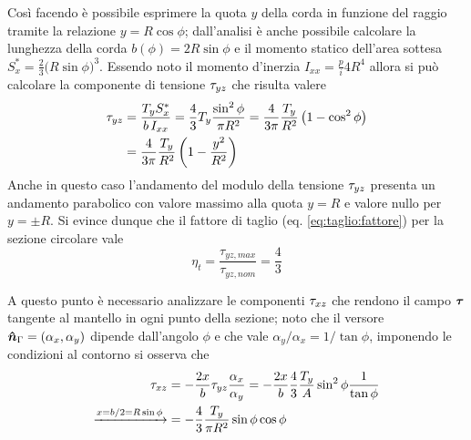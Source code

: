 		Così facendo è possibile esprimere la quota $y$ della corda in funzione del raggio tramite la relazione $y = R\cos\phi$; dall'analisi è anche possibile calcolare la lunghezza della corda $b(\phi) = 2R \sin\phi$ e il momento statico dell'area sottesa $S_x^* = \frac 2 3 \big(R\sin\phi\big)^3$. Essendo noto il momento d'inerzia $I_{xx} = \frac pi 4 R^4$ allora si può calcolare la componente di tensione $\tau_{yz}$ che risulta valere
		\begin{align*}
			\tau_{yz} &  = \frac {T_y S_x^*}{b\,I_{xx}} = \frac 4 3 T_y \frac{\sin^2\phi}{\pi R^2} = \frac 4{3\pi} \frac {T_y} {R^2} \left(1-\cos^2\phi\right) \\
			&  = \frac 4{3\pi} \frac {T_y} {R^2} \left(1-\frac{y^2}{R^2}\right)
		\end{align*}
		Anche in questo caso l'andamento del modulo della tensione $\tau_{yz}$ presenta un andamento parabolico con valore massimo alla quota $y = R$ e valore nullo per $y = \pm R$. Si evince dunque che il fattore di taglio (eq. \ref{eq:taglio:fattore}) per la sezione circolare vale
		\[ \eta_t = \frac{\tau_{yz,max}}{\tau_{yz,nom}} = \frac 4 3  \]
		
		\vspace{3mm}
		A questo punto è necessario analizzare le componenti $\tau_{xz}$ che rendono il campo $\boldsymbol{\tau}$ tangente al mantello in ogni punto della sezione; noto che il versore $\boldsymbol{\hat{n}}_\Gamma = (\alpha_x,\alpha_y)$ dipende dall'angolo $\phi$ e che vale $\alpha_y/\alpha_x= 1/\tan\phi$, imponendo le condizioni al contorno si osserva che
		\begin{align*}
			\tau_{xz} & = -\frac {2x}b\tau_{yz} \frac{\alpha_x}{\alpha_y} = - \frac{2x}{b} \frac 4 3 \frac {T_y} A \sin^2\phi \frac 1 {\tan\phi} \\
			\xrightarrow{x = b/2 = R\sin\phi} & = -\frac 4 3 \frac{T_y}{\pi R^2}\sin\phi\cos\phi	
		\end{align*}
		
		
		
		
		
		
		
		
		
		
		
		
		
		
		
		
		
		
		
		
		
		
		
		
		
		
		
		
		
		
		
		
		
		
		
		
		
		
		